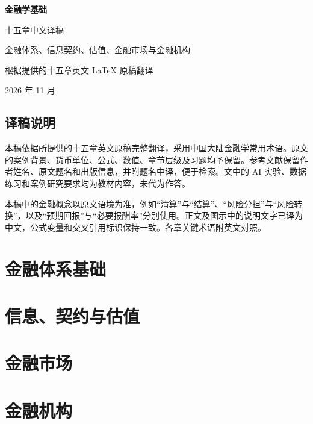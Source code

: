 \documentclass[UTF8,11pt,a4paper,oneside,openany,fontset=fandol]{ctexbook}
\begin{document}
\frontmatter
\begin{titlepage}
\centering
\vspace*{38mm}
{\Huge\bfseries 金融学基础\par}
\vspace{12mm}
{\Large 十五章中文译稿\par}
\vspace{8mm}
{\large 金融体系、信息契约、估值、金融市场与金融机构\par}
\vfill
{\normalsize 根据提供的十五章英文 LaTeX 原稿翻译\par}
\vspace{4mm}
{\small 2026 年 11 月\par}
\end{titlepage}
\chapter*{译稿说明}
本稿依据所提供的十五章英文原稿完整翻译，采用中国大陆金融学常用术语。原文的案例背景、货币单位、公式、数值、章节层级及习题均予保留。参考文献保留作者姓名、原文题名和出版信息，并附题名中译，便于检索。文中的 AI 实验、数据练习和案例研究要求均为教材内容，未代为作答。

本稿中的金融概念以原文语境为准，例如“清算”与“结算”、“风险分担”与“风险转换”，以及“预期回报”与“必要报酬率”分别使用。正文及图示中的说明文字已译为中文，公式变量和交叉引用标识保持一致。各章关键术语附英文对照。
\tableofcontents
\mainmatter
\part{金融体系基础}


\part{信息、契约与估值}



\part{金融市场}






\part{金融机构}




\end{document}

